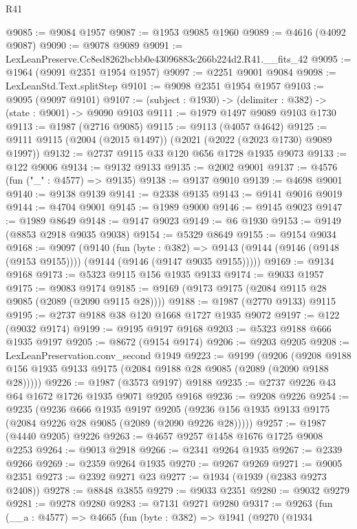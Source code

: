 \begin{lexlean}{R41}
\begin{coremodule}
@9085 := @9084 @1957
@9087 := @1953 @9085 @1960
@9089 := @4616 (@4092 @9087)
@9090 := @9078 @9089
@9091 := LexLeanPreserve.Cc8ed8262bcbb0e43096883c266b224d2.R41.__fits_42
@9095 := @1964 (@9091 @2351 @1954 @1957)
@9097 := @2251 @9001 @9084
@9098 := LexLeanStd.Text.splitStep
@9101 := @9098 @2351 @1954 @1957
@9103 := @9095 (@9097 @9101)
@9107 := (subject : @1930) -> (delimiter : @382) -> (state : @9001) -> @9090 @9103
@9111 := @1979 @1497 @9089 @9103 @1730
@9113 := @1987 (@2716 @9085)
@9115 := @9113 (@4057 @4642)
@9125 := @9111 @9115 (@2004 (@2015 @1497)) (@2021 (@2022 (@2023 @1730) @9089 @1997))
@9132 := @2737 @9115 @33 @120 @656 @1728 @1935 @9073
@9133 := @122 @9006
@9134 := @9132 @9133
@9135 := @2002 @9001
@9137 := @4576 (fun ("_" : @4577) => @9135)
@9138 := @9137 @9010
@9139 := @4698 @9001
@9140 := @9138 @9139
@9141 := @2338 @9135
@9143 := @9141 @9016 @9019
@9144 := @4704 @9001
@9145 := @1989 @9000
@9146 := @9145 @9023
@9147 := @1989 @8649
@9148 := @9147 @9023
@9149 := @6 @1930
@9153 := @9149 (@8853 @2918 @9035 @9038)
@9154 := @5329 @8649
@9155 := @9154 @9034
@9168 := @9097
    (@9140
      (fun (byte : @382) =>
      @9143 (@9144 (@9146 (@9148 (@9153 @9155)))) (@9144 (@9146 (@9147 @9035 @9155)))))
@9169 := @9134 @9168
@9173 := @5323 @9115 @156 @1935 @9133
@9174 := @9033 @1957
@9175 := @9083 @9174
@9185 := @9169 (@9173 @9175 (@2084 @9115 @28 @9085 (@2089 (@2090 @9115 @28))))
@9188 := @1987 (@2770 @9133) @9115
@9195 := @2737 @9188 @38 @120 @1668 @1727 @1935 @9072
@9197 := @122 (@9032 @9174)
@9199 := @9195 @9197 @9168
@9203 := @5323 @9188 @666 @1935 @9197
@9205 := @8672 (@9154 @9174)
@9206 := @9203 @9205
@9208 := LexLeanPreservation.conv_second @1949
@9223 := @9199
    (@9206 (@9208 @9188 @156 @1935 @9133 @9175 (@2084 @9188 @28 @9085 (@2089 (@2090 @9188 @28)))))
@9226 := @1987 (@3573 @9197) @9188
@9235 := @2737 @9226 @43 @64 @1672 @1726 @1935 @9071 @9205 @9168
@9236 := @9208 @9226
@9254 := @9235
    (@9236
      @666
      @1935
      @9197
      @9205
      (@9236 @156 @1935 @9133 @9175 (@2084 @9226 @28 @9085 (@2089 (@2090 @9226 @28)))))
@9257 := @1987 (@4440 @9205) @9226
@9263 := @4657 @9257 @1458 @1676 @1725 @9008 @2253
@9264 := @9013 @2918
@9266 := @2341 @9264 @1935
@9267 := @2339 @9266
@9269 := @2359 @9264 @1935
@9270 := @9267 @9269
@9271 := @9005 @2351
@9273 := @2392 @9271 @23
@9277 := @1934 (@1939 (@2383 @9273 @2408))
@9278 := @8848 @3855
@9279 := @9033 @2351
@9280 := @9032 @9279
@9281 := @9278 @9280
@9283 := @7131 @9271 @9280
@9317 := @9263
    (fun (__a : @4577) =>
    @4665
      (fun (byte : @382) =>
      @1941
        (@9270
          (@1934

\end{coremodule}
\end{lexlean}

